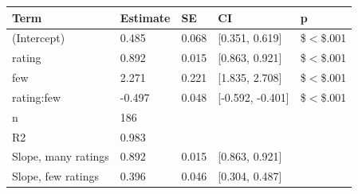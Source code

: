 \begin{table}[ht]
\centering
\begingroup\footnotesize
\begin{tabular}{lllll}
  \toprule
Term & Estimate & SE & CI & p \\ 
  \midrule
(Intercept) & 0.485 & 0.068 & [0.351, 0.619] & \$$<$\$.001 \\ 
  rating & 0.892 & 0.015 & [0.863, 0.921] & \$$<$\$.001 \\ 
  few & 2.271 & 0.221 & [1.835, 2.708] & \$$<$\$.001 \\ 
  rating:few & -0.497 & 0.048 & [-0.592, -0.401] & \$$<$\$.001 \\ 
  n & 186 &  &  &  \\ 
  R2 & 0.983 &  &  &  \\ 
  Slope, many ratings & 0.892 & 0.015 & [0.863, 0.921] &  \\ 
  Slope, few ratings & 0.396 & 0.046 & [0.304, 0.487] &  \\ 
   \bottomrule
\end{tabular}
\endgroup
\end{table}
